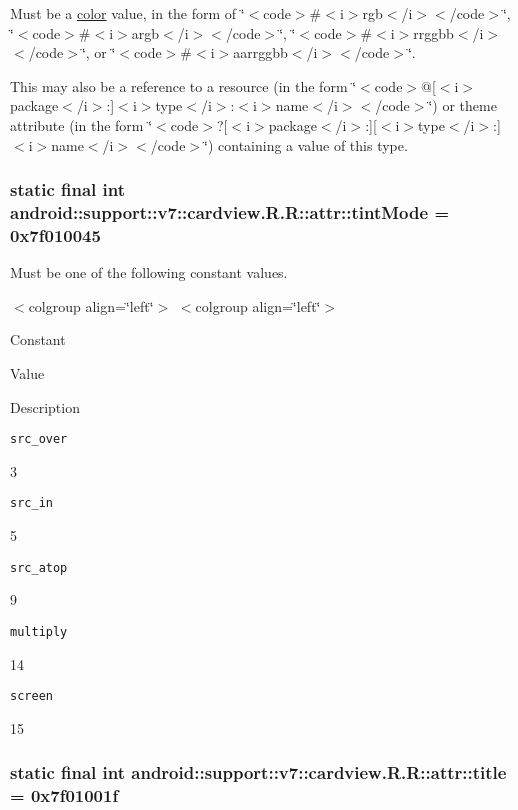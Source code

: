 Must be a \hyperlink{classandroid_1_1support_1_1v7_1_1cardview_1_1_r_1_1color}{color} value, in the form of \char`\"{}$<$code$>$\#$<$i$>$rgb$<$/i$>$$<$/code$>$\char`\"{}, \char`\"{}$<$code$>$\#$<$i$>$argb$<$/i$>$$<$/code$>$\char`\"{}, \char`\"{}$<$code$>$\#$<$i$>$rrggbb$<$/i$>$$<$/code$>$\char`\"{}, or \char`\"{}$<$code$>$\#$<$i$>$aarrggbb$<$/i$>$$<$/code$>$\char`\"{}. 

This may also be a reference to a resource (in the form \char`\"{}$<$code$>$@\mbox{[}$<$i$>$package$<$/i$>$:\mbox{]}$<$i$>$type$<$/i$>$:$<$i$>$name$<$/i$>$$<$/code$>$\char`\"{}) or theme attribute (in the form \char`\"{}$<$code$>$?\mbox{[}$<$i$>$package$<$/i$>$:\mbox{]}\mbox{[}$<$i$>$type$<$/i$>$:\mbox{]}$<$i$>$name$<$/i$>$$<$/code$>$\char`\"{}) containing a value of this type. \hypertarget{classandroid_1_1support_1_1v7_1_1cardview_1_1_r_1_1attr_20a9de823d3cb08d78dedf4e28abc855}{
\subsubsection[{tintMode}]{\setlength{\rightskip}{0pt plus 5cm}static final int android::support::v7::cardview.R.R::attr::tintMode = 0x7f010045}}
\label{classandroid_1_1support_1_1v7_1_1cardview_1_1_r_1_1attr_20a9de823d3cb08d78dedf4e28abc855}


Must be one of the following constant values. \begin{TabularC}{0}
\hline
\end{TabularC}
$<$colgroup align=\char`\"{}left\char`\"{}$>$ $<$colgroup align=\char`\"{}left\char`\"{}$>$ 

Constant

Value

Description 

{\tt src\_\-over}

3

{\tt src\_\-in}

5

{\tt src\_\-atop}

9

{\tt multiply}

14

{\tt screen}

15\hypertarget{classandroid_1_1support_1_1v7_1_1cardview_1_1_r_1_1attr_f959b6cb4cc89b202e0d7168e7c8840b}{
\subsubsection[{title}]{\setlength{\rightskip}{0pt plus 5cm}static final int android::support::v7::cardview.R.R::attr::title = 0x7f01001f}}
\label{classandroid_1_1support_1_1v7_1_1cardview_1_1_r_1_1attr_f959b6cb4cc89b202e0d7168e7c8840b}


